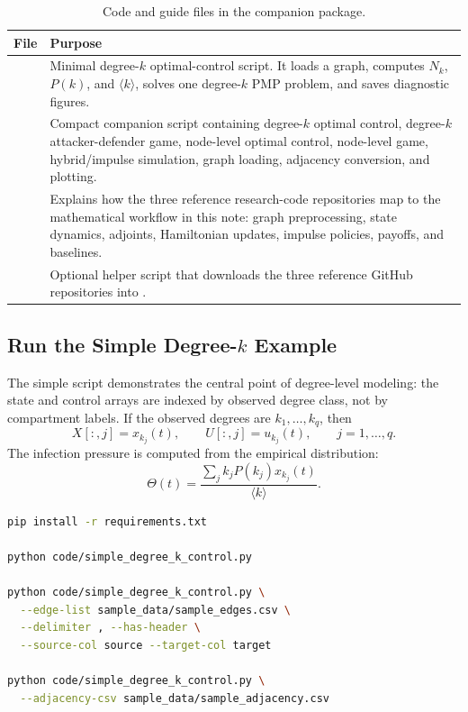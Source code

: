 \documentclass[11pt,a4paper]{article}
\begin{document}
\begin{table}[h!]
\centering
\caption{Code and guide files in the companion package.}
\begin{tabularx}{\textwidth}{L{4.8cm}Y}
\toprule
\textbf{File} & \textbf{Purpose} \\
\midrule
{} & Minimal degree-$k$ optimal-control script. It loads a graph, computes $N_k$, $P(k)$, and $\langle k\rangle$, solves one degree-$k$ PMP problem, and saves diagnostic figures. \\
 & Compact companion script containing degree-$k$ optimal control, degree-$k$ attacker-defender game, node-level optimal control, node-level game, hybrid/impulse simulation, graph loading, adjacency conversion, and plotting. \\
 & Explains how the three reference research-code repositories map to the mathematical workflow in this note: graph preprocessing, state dynamics, adjoints, Hamiltonian updates, impulse policies, payoffs, and baselines. \\
 & Optional helper script that downloads the three reference GitHub repositories into . \\
\bottomrule
\end{tabularx}
\end{table}

\subsection{Run the Simple Degree-$k$ Example}

The simple script demonstrates the central point of degree-level modeling: the state and control arrays are indexed by observed degree class, not by compartment labels.  If the observed degrees are $k_1,\dots,k_q$, then
\[
X[:,j]=x_{k_j}(t),\qquad U[:,j]=u_{k_j}(t),\qquad j=1,\dots,q.
\]
The infection pressure is computed from the empirical distribution:
\[
\Theta(t)=\frac{\sum_j k_j P(k_j)x_{k_j}(t)}{\langle k\rangle}.
\]

\begin{lstlisting}[language=bash,caption={Run the minimal degree-k optimal-control script.},numbers=none]
pip install -r requirements.txt

python code/simple_degree_k_control.py

python code/simple_degree_k_control.py \
  --edge-list sample_data/sample_edges.csv \
  --delimiter , --has-header \
  --source-col source --target-col target

python code/simple_degree_k_control.py \
  --adjacency-csv sample_data/sample_adjacency.csv
\end{lstlisting}
\end{document}
